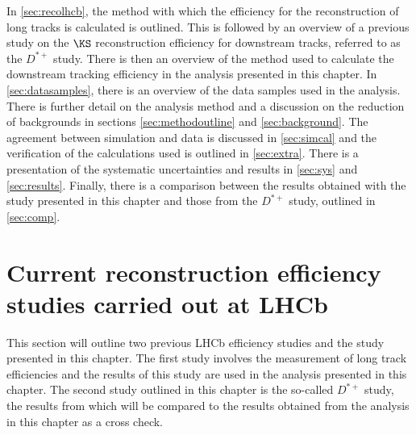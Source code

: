 

 




In \autoref{sec:recolhcb}, the method with which the efficiency for the reconstruction of long tracks is calculated is outlined. This is followed by an overview of a previous study on the $\KS$ reconstruction efficiency for downstream tracks, referred to as the $D^{*+}$ study. There is then an overview of the method used to calculate the downstream tracking efficiency in the analysis presented in this chapter. In \autoref{sec:datasamples}, there is an overview of the data samples used in the analysis. There is further detail on the analysis method and a discussion on the reduction of backgrounds in sections \ref{sec:methodoutline} and \ref{sec:background}. The agreement between simulation and data is discussed in \autoref{sec:simcal} and the verification of the calculations used is outlined in \autoref{sec:extra}. There is a presentation of the systematic uncertainties and results in \autoref{sec:sys} and \autoref{sec:results}. Finally, there is a comparison between the results obtained with the study presented in this chapter and those from the $D^{*+}$ study, outlined in \autoref{sec:comp}. %

\section{Current reconstruction efficiency studies carried out at LHCb}
\label{sec:recolhcb}
This section will outline two previous LHCb efficiency studies and the study presented in this chapter. The first study involves the measurement of long track efficiencies and the results of this study are used in the analysis presented in this chapter.  The second study outlined in this chapter is the so-called $D^{*+}$ study, the results from which will be compared to the results obtained from the analysis in this chapter as a cross check. %

